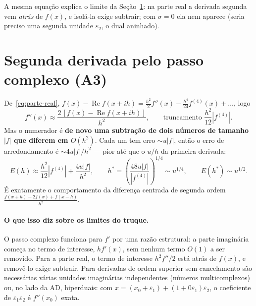 \documentclass[11pt,a4paper]{article}
\renewcommand{\Re}{\operatorname{Re}}
\begin{document}
A mesma equação explica o limite da Seção~\ref{sec:segunda}: na parte real a derivada segunda vem \emph{atrás} de $f(x)$, e isolá-la exige subtrair; com $\sigma=0$ ela nem aparece (seria preciso uma segunda unidade $\varepsilon_2$, o dual aninhado). 

\section{Segunda derivada pelo passo complexo (A3)}
\label{sec:segunda}

De~\eqref{eq:parte-real}, $f(x)-\Re f(x+ih) = \frac{h^2}{2}f''(x) - \frac{h^4}{24}f^{(4)}(x)+\dots$, logo
\begin{equation}
f''(x) \approx \frac{2\,[f(x)-\Re f(x+ih)]}{h^2}, \qquad \text{truncamento } \frac{h^2}{12}|f^{(4)}|.
\end{equation}
Mas o numerador é \textbf{de novo uma subtração de dois números de tamanho $|f|$ que diferem em $O(h^2)$}. Cada um tem erro $\sim u|f|$, então o erro de arredondamento é $\sim 4u|f|/h^2$ --- pior até que o $u/h$ da primeira derivada:
\begin{equation}
E(h) \approx \frac{h^2}{12}|f^{(4)}| + \frac{4u|f|}{h^2}, \qquad h^\ast = \left(\frac{48u|f|}{|f^{(4)}|}\right)^{1/4}\sim u^{1/4},\qquad E(h^\ast)\sim u^{1/2}.
\end{equation}
É exatamente o comportamento da diferença centrada de segunda ordem $\frac{f(x+h)-2f(x)+f(x-h)}{h^2}$.


\paragraph{O que isso diz sobre os limites do truque.} O passo complexo funciona para $f'$ por uma razão estrutural: a parte imaginária começa no termo de interesse, $hf'(x)$, sem nenhum termo $O(1)$ a ser removido. Para a parte real, o termo de interesse $h^2f''/2$ está atrás de $f(x)$, e removê-lo exige subtrair. Para derivadas de ordem superior sem cancelamento são necessárias várias unidades imaginárias independentes (números multicomplexos) ou, no lado da AD, hiperduais: com $x = (x_0+\varepsilon_1)+(1+0\varepsilon_1)\varepsilon_2$, o coeficiente de $\varepsilon_1\varepsilon_2$ é $f''(x_0)$ exata. 
\end{document}
